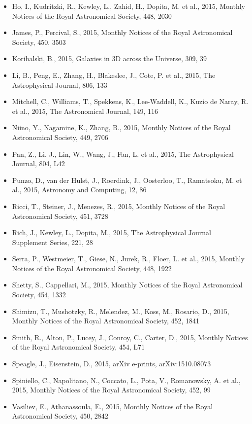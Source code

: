 \documentclass{letter}
\begin{document}
\begin{enumerate}
\begin{itemize}
\item Ho, I., Kudritzki, R., Kewley, L., Zahid, H., Dopita, M. et al., 2015, Monthly Notices of the Royal Astronomical Society, 448, 2030
\item James, P., Percival, S., 2015, Monthly Notices of the Royal Astronomical Society, 450, 3503
\item Koribalski, B., 2015, Galaxies in 3D across the Universe, 309, 39
\item Li, B., Peng, E., Zhang, H., Blakeslee, J., Cote, P. et al., 2015, The Astrophysical Journal, 806, 133
\item Mitchell, C., Williams, T., Spekkens, K., Lee-Waddell, K., Kuzio de Naray, R. et al., 2015, The Astronomical Journal, 149, 116
\item Niino, Y., Nagamine, K., Zhang, B., 2015, Monthly Notices of the Royal Astronomical Society, 449, 2706
\item Pan, Z., Li, J., Lin, W., Wang, J., Fan, L. et al., 2015, The Astrophysical Journal, 804, L42
\item Punzo, D., van der Hulst, J., Roerdink, J., Oosterloo, T., Ramatsoku, M. et al., 2015, Astronomy and Computing, 12, 86
\item Ricci, T., Steiner, J., Menezes, R., 2015, Monthly Notices of the Royal Astronomical Society, 451, 3728
\item Rich, J., Kewley, L., Dopita, M., 2015, The Astrophysical Journal Supplement Series, 221, 28
\item Serra, P., Westmeier, T., Giese, N., Jurek, R., Floer, L. et al., 2015, Monthly Notices of the Royal Astronomical Society, 448, 1922
\item Shetty, S., Cappellari, M., 2015, Monthly Notices of the Royal Astronomical Society, 454, 1332
\item Shimizu, T., Mushotzky, R., Melendez, M., Koss, M., Rosario, D., 2015, Monthly Notices of the Royal Astronomical Society, 452, 1841
\item Smith, R., Alton, P., Lucey, J., Conroy, C., Carter, D., 2015, Monthly Notices of the Royal Astronomical Society, 454, L71
\item Speagle, J., Eisenstein, D., 2015, arXiv e-prints, arXiv:1510.08073
\item Spiniello, C., Napolitano, N., Coccato, L., Pota, V., Romanowsky, A. et al., 2015, Monthly Notices of the Royal Astronomical Society, 452, 99
\item Vasiliev, E., Athanassoula, E., 2015, Monthly Notices of the Royal Astronomical Society, 450, 2842

\end{itemize}
\end{enumerate}
\end{document}
